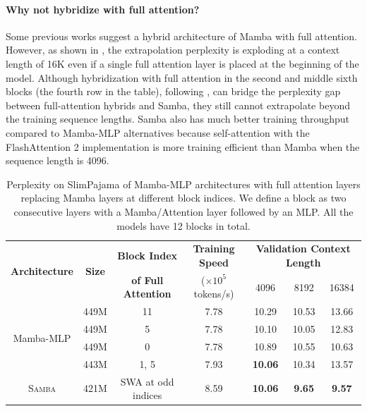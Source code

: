 \documentclass{article}
\begin{document}
\paragraph{Why not hybridize with full attention?} Some previous works \citep{h3,lieber2024jamba} suggest a hybrid architecture of Mamba with full attention. However, as shown in , the extrapolation perplexity is exploding at a context length of 16K even if a single full attention layer is placed at the beginning of the model. Although hybridization with full attention in the second and middle sixth blocks (the fourth row in the table), following \cite{dao2022hungry}, can bridge the perplexity gap between full-attention hybrids and Samba, they still cannot extrapolate beyond the training sequence lengths.
 Samba also has much better training throughput compared to Mamba-MLP alternatives because self-attention with the FlashAttention 2 implementation is more training efficient than Mamba when the sequence length is 4096.


\begin{table}[h]
\centering
\small
\caption{Perplexity on SlimPajama of Mamba-MLP architectures with full attention layers replacing Mamba layers at different block indices. We define a block as two consecutive layers with a Mamba/Attention layer followed by an MLP. All the models have 12 blocks in total.} 
\vspace{0.cm}
\begin{tabular}{ccccccc}
\toprule
\multirow{2}{*}{\bf Architecture} & \multirow{2}{*}{\bf Size} & \bf Block Index     & \bf Training Speed &  \multicolumn{3 }{c}{\bf Validation Context Length} \\
 &  & \bf of Full Attention &  ($\times 10^5$ tokens/s) &  4096  &   8192 &   16384 \\ 
\midrule

\multirow{4}{*}{ Mamba-MLP} & 449M & 11 & 7.78   & 10.29 & 10.53 & 13.66 \\
& 449M  & 5  & 7.78   & 10.10 & 10.05 & 12.83  \\
& 449M  & 0  & 7.78   & 10.89 & 10.55 & 10.63  \\
 & 443M   & 1, 5  & 7.93  & \bf 10.06 & 10.34 & 13.57 \\
 \midrule
\textsc{Samba} & 421M  & SWA at odd indices  & 8.59 & \bf 10.06  & \bf 9.65 & \bf 9.57 \\

\bottomrule
\end{tabular}
\label{tab:full}
\vspace{-0.2cm}
\end{table}
\end{document}
